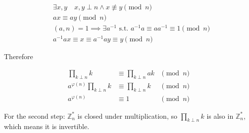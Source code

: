 \documentclass{article}
\newcommand{\ZZ}{\mathbb{Z}}
\begin{document}
$$
\begin{aligned}
	&\exists x,y\quad x,y\perp n\land x\not\equiv y\pmod n\\
	&ax\equiv ay\pmod n\\
	&(a,n)=1\implies \exists a^{-1}\text{ s.t. } a^{-1}a\equiv aa^{-1}\equiv 1\pmod n\\
	&a^{-1}ax\equiv x\equiv a^{-1}ay\equiv y\pmod n
\end{aligned}
$$

Therefore

$$
\begin{aligned}
	\prod_{k\perp n} k &\equiv \prod_{k\perp n} ak &\pmod n\\
	a^{\varphi(n)} \prod_{k\perp n} k&\equiv \prod_{k\perp n} k  &\pmod n\\
	a^{\varphi(n)} &\equiv 1&\pmod n
\end{aligned}
$$

For the second step: $\ZZ_n^\ast$ is closed under multiplication,
so $\prod_{k\perp n} k$ is also in $\ZZ_n^\ast$, which means it is invertible.


\newpage
\end{document}
